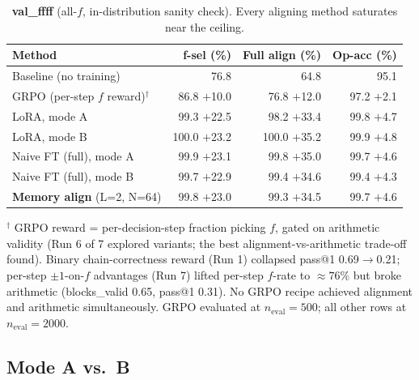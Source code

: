 \documentclass[10pt]{article}
\newcommand{\posv}[1]{\textcolor{good}{\,{\scriptsize$+$#1}}}
\begin{document}
\begin{table}[ht]
  \centering\small
  \caption{\textbf{val\_ffff} (all-$f$, in-distribution sanity check). Every
    aligning method saturates near the ceiling.}
  \label{tab:ffff}
  \begin{tabular}{lrrr}
    \toprule
    \textbf{Method}
      & \textbf{f-sel} (\%)
      & \textbf{Full align} (\%)
      & \textbf{Op-acc} (\%) \\
    \midrule
    Baseline (no training)            & 76.8              & 64.8              & 95.1              \\
    \midrule
    GRPO (per-step $f$ reward)$^{\dagger}$   & 86.8\,\posv{10.0}   & 76.8\,\posv{12.0}   & 97.2\,\posv{2.1}    \\
    LoRA, mode A                      & 99.3\,\posv{22.5}   & 98.2\,\posv{33.4}   & 99.8\,\posv{4.7}    \\
    LoRA, mode B                      & 100.0\,\posv{23.2}  & 100.0\,\posv{35.2}  & 99.9\,\posv{4.8}    \\
    Naive FT (full), mode A           & 99.9\,\posv{23.1}   & 99.8\,\posv{35.0}   & 99.7\,\posv{4.6}    \\
    Naive FT (full), mode B           & 99.7\,\posv{22.9}   & 99.4\,\posv{34.6}   & 99.4\,\posv{4.3}    \\
    \rowcolor{rowhl}
    \textbf{Memory align} (L=2, N=64) & 99.8\,\posv{23.0}   & 99.3\,\posv{34.5}   & 99.7\,\posv{4.6}    \\
    \bottomrule
  \end{tabular}
\end{table}

\vspace{4pt}

{\small $^{\dagger}$ GRPO reward = per-decision-step fraction picking $f$,
gated on arithmetic validity (Run 6 of 7 explored variants; the best
alignment-vs-arithmetic trade-off found). Binary chain-correctness reward
(Run 1) collapsed pass@1 0.69$\to$0.21; per-step $\pm 1$-on-$f$ advantages
(Run 7) lifted per-step $f$-rate to $\approx 76\%$ but broke arithmetic
(blocks\_valid 0.65, pass@1 0.31). No GRPO recipe achieved alignment and
arithmetic simultaneously. GRPO evaluated at $n_\text{eval}{=}500$; all
other rows at $n_\text{eval}{=}2000$.}

\vspace{4pt}

\subsection*{Mode A vs.\ B}
\end{document}
